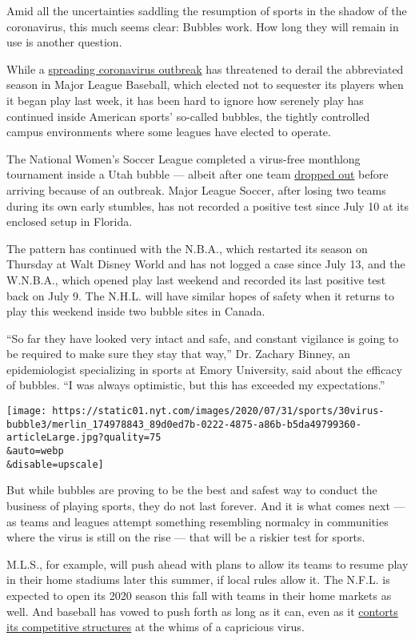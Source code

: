 Amid all the uncertainties saddling the resumption of sports in the
shadow of the coronavirus, this much seems clear: Bubbles work. How long
they will remain in use is another question.

While a
\href{https://twitter.com/Phillies/status/1288882323614846976?s=20}{spreading
coronavirus outbreak} has threatened to derail the abbreviated season in
Major League Baseball, which elected not to sequester its players when
it began play last week, it has been hard to ignore how serenely play
has continued inside American sports' so-called bubbles, the tightly
controlled campus environments where some leagues have elected to
operate.

The National Women's Soccer League completed a virus-free monthlong
tournament inside a Utah bubble --- albeit after one team
\href{https://www.nytimes.com/2020/06/22/sports/soccer/orlando-pride-nwsl-coronavirus.html}{dropped
out} before arriving because of an outbreak. Major League Soccer, after
losing two teams during its own early stumbles, has not recorded a
positive test since July 10 at its enclosed setup in Florida.

The pattern has continued with the N.B.A., which restarted its season on
Thursday at Walt Disney World and has not logged a case since July 13,
and the W.N.B.A., which opened play last weekend and recorded its last
positive test back on July 9. The N.H.L. will have similar hopes of
safety when it returns to play this weekend inside two bubble sites in
Canada.

``So far they have looked very intact and safe, and constant vigilance
is going to be required to make sure they stay that way,'' Dr. Zachary
Binney, an epidemiologist specializing in sports at Emory University,
said about the efficacy of bubbles. ``I was always optimistic, but this
has exceeded my expectations.''

\texttt{[image: https://static01.nyt.com/images/2020/07/31/sports/30virus-bubble3/merlin\_174978843\_89d0ed7b-0222-4875-a86b-b5da49799360-articleLarge.jpg?quality=75\\\&auto=webp\\\&disable=upscale]}

But while bubbles are proving to be the best and safest way to conduct
the business of playing sports, they do not last forever. And it is what
comes next --- as teams and leagues attempt something resembling
normalcy in communities where the virus is still on the rise --- that
will be a riskier test for sports.

M.L.S., for example, will push ahead with plans to allow its teams to
resume play in their home stadiums later this summer, if local rules
allow it. The N.F.L. is expected to open its 2020 season this fall with
teams in their home markets as well. And baseball has vowed to push
forth as long as it can, even as it
\href{https://www.nytimes.com/2020/07/27/sports/baseball/coronavirus-yankees-marlins-phillies.html}{contorts
its competitive structures} at the whims of a capricious virus.


